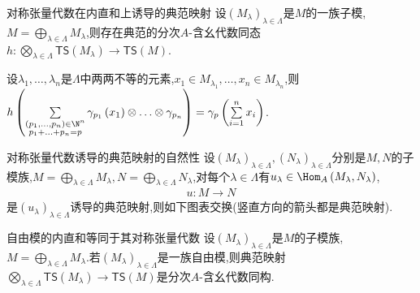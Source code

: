 \begin{proposition}{对称张量代数在内直和上诱导的典范映射}{}
	设$\left(M_{\lambda}\right)_{\lambda\in\Lambda}$是$M$的一族子模,$M=\bigoplus\limits_{\lambda\in\Lambda}M_{\lambda}$,则存在典范的分次$A$-含幺代数同态$h:\bigotimes\limits_{\lambda\in\Lambda}\mathsf{TS}\left(M_{\lambda}\right)\to\mathsf{TS}\left(M\right)$.
\end{proposition}

\begin{remark}{}{}	
	设$\lambda_{1},\ldots,\lambda_{n}$是$\Lambda$中两两不等的元素,$x_{1}\in M_{\lambda_{1}},\ldots,x_{n}\in M_{\lambda_{n}}$,则$h\left(\sum\limits_{\substack{\left(p_{1},\ldots,p_{n}\right)\in\N^{n}\\p_{1}+\ldots+p_{n}=p}}\gamma_{p_{1}}\left(x_{1}\right)\otimes\ldots\otimes\gamma_{p_{n}}\right)=\gamma_{p}\left(\sum\limits_{i=1}^{n}x_{i}\right)$.
\end{remark}

\begin{proposition}{对称张量代数诱导的典范映射的自然性}{}
	设$\left(M_{\lambda}\right)_{\lambda\in\Lambda},\left(N_{\lambda}\right)_{\lambda\in\Lambda}$分别是$M,N$的子模族,$M=\bigoplus\limits_{\lambda\in\Lambda}M_{\lambda},N=\bigoplus\limits_{\lambda\in\Lambda}N_{\lambda}$,对每个$\lambda\in\Lambda$有$u_{\lambda}\in\Hom_{A}\left(M_{\lambda},N_{\lambda}\right)$,
	\begin{align*}
		u:M\to N
	\end{align*}
	是$\left(u_{\lambda}\right)_{\lambda\in\Lambda}$诱导的典范映射,则如下图表交换(竖直方向的箭头都是典范映射).
	\begin{center}
	\end{center}
\end{proposition}

\begin{proposition}{自由模的内直和等同于其对称张量代数}{}
	设$\left(M_{\lambda}\right)_{\lambda\in\Lambda}$是$M$的子模族,$M=\bigoplus\limits_{\lambda\in\Lambda}M_{\lambda}$.若$\left(M_{\lambda}\right)_{\lambda\in\Lambda}$是一族自由模,则典范映射$\bigotimes\limits_{\lambda\in\Lambda}\mathsf{TS}\left(M_{\lambda}\right)\to\mathsf{TS}\left(M\right)$是分次$A$-含幺代数同构.
\end{proposition}

